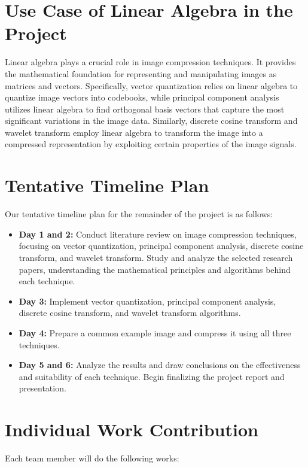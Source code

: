 \documentclass{article}
\begin{document}
\section{Use Case of Linear Algebra in the Project}
Linear algebra plays a crucial role in image compression techniques. It provides the mathematical foundation for representing and manipulating images as matrices and vectors. Specifically, vector quantization relies on linear algebra to quantize image vectors into codebooks, while principal component analysis utilizes linear algebra to find orthogonal basis vectors that capture the most significant variations in the image data. Similarly, discrete cosine transform and wavelet transform employ linear algebra to transform the image into a compressed representation by exploiting certain properties of the image signals.

\section{Tentative Timeline Plan}
Our tentative timeline plan for the remainder of the project is as follows:

\begin{itemize}
    \item \textbf{Day 1 and 2:} Conduct literature review on image compression techniques, focusing on vector quantization, principal component analysis, discrete cosine transform, and wavelet transform. Study and analyze the selected research papers, understanding the mathematical principles and algorithms behind each technique.
    \item \textbf{Day 3:} Implement vector quantization, principal component analysis, discrete cosine transform, and wavelet transform algorithms.
    \item \textbf{Day 4:} Prepare a common example image and compress it using all three techniques.
    \item \textbf{Day 5 and 6:} Analyze the results and draw conclusions on the effectiveness and suitability of each technique. Begin finalizing the project report and presentation.
\end{itemize}

\section{Individual Work Contribution}
Each team member will do the following works:
\end{document}
